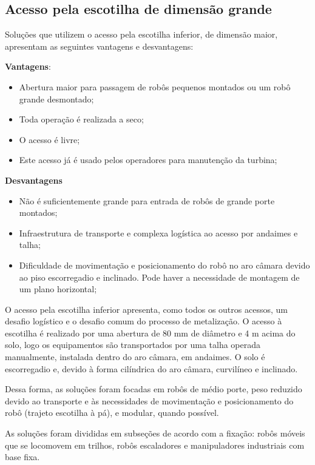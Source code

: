 \subsection{Acesso pela escotilha de dimensão grande}
Soluções que utilizem o acesso pela escotilha inferior, de dimensão maior,
apresentam as seguintes vantagens e desvantagens:

\textbf{Vantagens}:
\begin{itemize}
  \item Abertura maior para passagem de robôs pequenos montados ou um robô
  grande desmontado;
  \item Toda operação é realizada a seco;
  \item O acesso é livre;
  \item Este acesso já é usado pelos operadores para manutenção da turbina;
\end{itemize}

\textbf{Desvantagens}
\begin{itemize}
  \item Não é suficientemente grande para entrada de robôs de grande
  porte montados;
  \item Infraestrutura de transporte e complexa logística ao acesso por
  andaimes e talha;
  \item Dificuldade de movimentação e posicionamento do robô no aro câmara
  devido ao piso escorregadio e inclinado. Pode haver a necessidade de montagem
  de um plano horizontal; 
\end{itemize}

O acesso pela escotilha inferior apresenta, como todos os outros
acessos, um desafio logístico e o desafio comum do processo de metalização. O
acesso à escotilha é realizado por uma abertura de 80 mm de diâmetro e 4 m acima
do solo, logo os equipamentos são transportados por uma talha operada manualmente,
instalada dentro do aro câmara, em andaimes. O solo é escorregadio e, devido à
forma cilíndrica do aro câmara, curvilíneo e inclinado.

Dessa forma, as soluções foram focadas em robôs de médio porte, peso reduzido
devido ao transporte e às necessidades de movimentação e posicionamento do robô
(trajeto escotilha à pá), e modular, quando possível.

As soluções foram divididas em subseções de acordo com a fixação:
robôs móveis que se locomovem em trilhos, robôs escaladores e manipuladores
industriais com base fixa. 




 
%